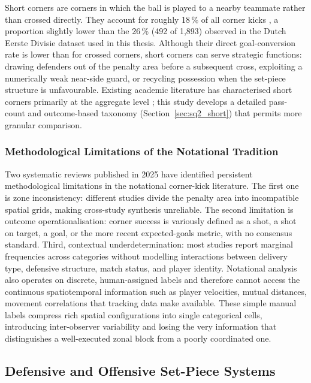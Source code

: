 Short corners are corners in which the ball is played to a nearby teammate rather than
crossed directly. They account for roughly 18\,\% of all corner kicks
\citep{Casal2015}, a proportion slightly lower than the 26\,\% (492 of 1{,}893)
observed in the Dutch Eerste Divisie dataset used in this thesis. Although their
direct goal-conversion rate is lower than for crossed corners, short corners can
serve strategic functions: drawing defenders out of the penalty area before a
subsequent cross, exploiting a numerically weak near-side guard, or recycling
possession when the set-piece structure is unfavourable. Existing academic
literature has characterised short corners primarily at the aggregate level
\citep{Sarmento2025}; this study develops a detailed pass-count and
outcome-based taxonomy (Section~\ref{sec:sq2_short}) that permits more granular
comparison.

\subsubsection{Methodological Limitations of the Notational Tradition}

Two systematic reviews published in 2025 \citep{Sarmento2025, MDPI2025} have
identified persistent methodological limitations in the notational corner-kick
literature. The first one is zone inconsistency: different studies divide the
penalty area into incompatible spatial grids, making cross-study synthesis
unreliable. The second limitation is outcome operationalisation: corner success is
variously defined as a shot, a shot on target, a goal, or the more recent
expected-goals metric, with no consensus standard. Third, contextual
underdetermination: most studies report marginal frequencies across categories
without modelling interactions between delivery type, defensive structure, match
status, and player identity. Notational analysis also operates on discrete,
human-assigned labels and therefore cannot access the continuous spatiotemporal
information such as player velocities, mutual distances, movement correlations
that tracking data make available. These simple manual labels compress rich
spatial configurations into single categorical cells, introducing inter-observer
variability and losing the very information that distinguishes a well-executed
zonal block from a poorly coordinated one.

\subsection{Defensive and Offensive Set-Piece Systems}
\label{sec:lit_coaching}

